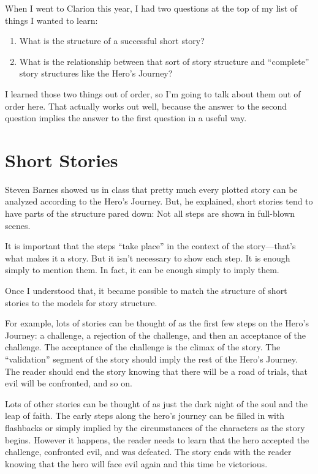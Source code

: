 \documentclass[openleft,oneside,showtrims]{memoir}
\begin{document}
When I went to Clarion this year, I had two questions at the top of my list of things I wanted to learn:

\begin{enumerate}
\item What is the structure of a successful short story?

\item What is the relationship between that sort of story structure and “complete” story structures like the Hero’s Journey?
\end{enumerate}

I learned those two things out of order, so I’m going to talk about them out of order here. That actually works out well, because the answer to the second question implies the answer to the first question in a useful way.

\section{Short Stories}
\label{sec:orgd6c044a}

Steven Barnes showed us in class that pretty much every plotted story can be analyzed according to the Hero’s Journey. But, he explained, short stories tend to have parts of the structure pared down: Not all steps are shown in full-blown scenes.

It is important that the steps “take place” in the context of the story—that’s what makes it a story.  But it isn't necessary to show each step.  It is enough simply to mention them.  In fact, it can be enough simply to imply them.

Once I understood that, it became possible to match the structure of short stories to the 
models for story structure.

For example, lots of stories can be thought of as the first few steps on the Hero’s Journey: a challenge, a rejection of the challenge, and then an acceptance of the challenge. The acceptance of the challenge is the climax of the story. The “validation” segment of the story should imply the rest of the Hero’s Journey. The reader should end the story knowing that there will be a road of trials, that evil will be confronted, and so on.

Lots of other stories can be thought of as just the dark night of the soul and the leap of faith. The early steps along the hero’s journey can be filled in with flashbacks or simply implied by the circumstances of the characters as the story begins. However it happens, the reader needs to learn that the hero accepted the challenge, confronted evil, and was defeated. The story ends with the reader knowing that the hero will face evil again and this time be victorious.
\end{document}
